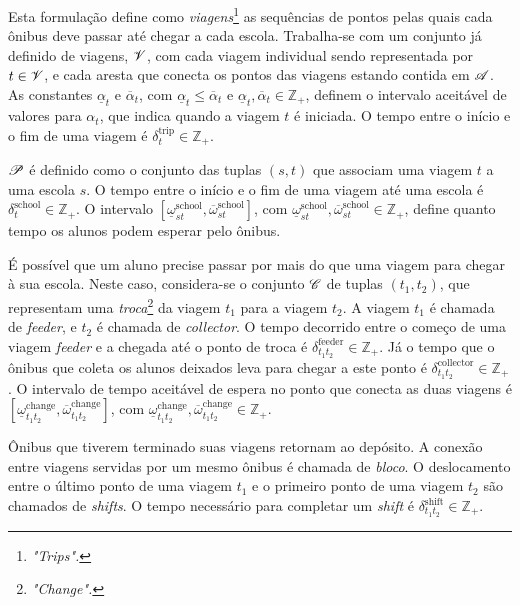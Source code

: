 Esta formulação define como \emph{viagens}\footnote{\emph{"Trips".}} as sequências de pontos pelas quais cada ônibus deve passar até chegar a cada escola. Trabalha-se com um conjunto já definido de viagens, $\mathcal{V}$, com cada viagem individual sendo representada por $t \in \mathcal{V}$, e cada aresta que conecta os pontos das viagens estando contida em $\mathcal{A}$. As constantes $\underline{\alpha}_t$ e $\overline{\alpha}_t$, com $\underline{\alpha}_t \leq \overline{\alpha}_t$ e $\underline{\alpha}_t, \overline{\alpha}_t\in \mathbb{Z}_+$, definem o intervalo aceitável de valores para $\alpha_t$, que indica quando a viagem $t$ é iniciada. O tempo entre o início e o fim de uma viagem é $\delta_t^{\text{trip}} \in \mathbb{Z_+}$.

$\mathcal{P}$ é definido como o conjunto das tuplas $(s,t)$ que associam uma viagem $t$ a uma escola $s$. O tempo entre o início e o fim de uma viagem até uma escola é $\delta_t^{\text{school}}\in \mathbb{Z_+}$. O intervalo $[\underline{\omega}_{st}^{\text{school}},\overline{\omega}_{st}^{\text{school}}]$, com $\underline{\omega}_{st}^{\text{school}},\overline{\omega}_{st}^{\text{school}} \in \mathbb{Z_+}$, define quanto tempo os alunos podem esperar pelo ônibus.

É possível que um aluno precise passar por mais do que uma viagem para chegar à sua escola. Neste caso, considera-se o conjunto $\mathcal{C}$ de tuplas $(t_1,t_2)$, que representam uma \emph{troca}\footnote{\emph{"Change".}} da viagem $t_1$ para a viagem $t_2$. A viagem $t_1$ é chamada de \emph{feeder}, e $t_2$ é chamada de \emph{collector}. O tempo decorrido entre o começo de uma viagem \emph{feeder} e a chegada até o ponto de troca é $\delta_{t_1t_2}^{\text{feeder}} \in \mathbb{Z_+}$. Já o tempo que o ônibus que coleta os alunos deixados leva para chegar a este ponto é $\delta_{t_1t_2}^{\text{collector}} \in \mathbb{Z_+}$. O intervalo de tempo aceitável de espera no ponto que conecta as duas viagens é $[\underline{\omega}_{t_1t_2}^{\text{change}}, \overline{\omega}_{t_1t_2}^{\text{change}}]$, com $\underline{\omega}_{t_1t_2}^{\text{change}}, \overline{\omega}_{t_1t_2}^{\text{change}} \in \mathbb{Z}_+.$

Ônibus que tiverem terminado suas viagens retornam ao depósito. A conexão entre viagens servidas por um mesmo ônibus é chamada de \emph{bloco}. O deslocamento entre o último ponto de uma viagem $t_1$ e o primeiro ponto de uma viagem $t_2$ são chamados de \emph{shifts}. O tempo necessário para completar um \emph{shift} é $\delta_{t_1t_2}^{\text{shift}} \in \mathbb{Z}_+$.

